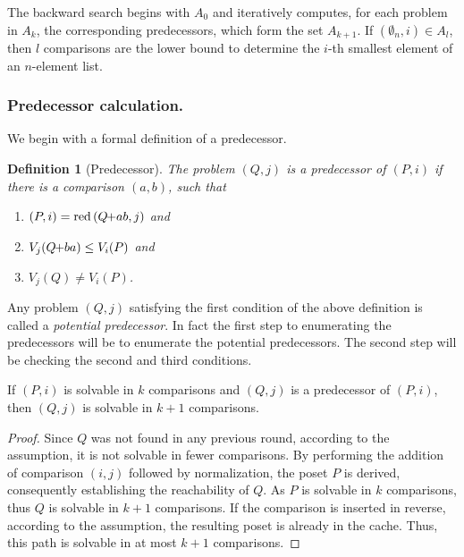 \documentclass[twoside,leqno,twocolumn]{article}
\newcommand{\pchild}[3]{{#1}\kern-1pt{+}{#2}{#3}}
\newcommand{\reduced}[1]{\operatorname{red}{#1}}
\newtheorem{definition}{Definition}[section]
\begin{document}
The backward search begins with $A_0$ and iteratively computes, for each problem in $A_k$, the corresponding predecessors, which form the set $A_{k + 1}$.
If $(\emptyset_n, i) \in A_l$, then $l$ comparisons are the lower bound to determine the $i$-th smallest element of an $n$-element list.


\subsubsection{Predecessor calculation.} \label{sec:backward:predecessor_calculation}
We begin with a formal definition of a predecessor.

\begin{definition}[Predecessor] \label{definition:predecessor_calculation}
  The problem $(Q, j)$ is a \emph{predecessor} of $(P, i)$ if there is a comparison $(a, b)$, such that
  \begin{enumerate}
    \item $(P, i) = \reduced(\pchild{Q}{a}{b}, j)$ and
    \item $V_j(\pchild{Q}{b}{a}) \le V_i(P)$ and
    \item $V_j(Q) \neq V_i(P)$.
  \end{enumerate}
\end{definition}

Any problem $(Q, j)$ satisfying the first condition of the above definition is called a \emph{potential predecessor}.
In fact the first step to enumerating the predecessors will be to enumerate the potential predecessors.
The second step will be checking the second and third conditions.

\begin{lemma} \label{lemma:predecessor_calculation}
  If $(P, i)$ is solvable in $k$ comparisons and $(Q, j)$ is a predecessor of $(P, i)$, then $(Q, j)$ is solvable in $k + 1$ comparisons.
\end{lemma}

\begin{proof} \label{proof:predecessor_calculation}
  Since $Q$ was not found in any previous round, according to the assumption, it is not solvable in fewer comparisons.
  By performing the addition of comparison $(i, j)$ followed by normalization, the poset $P$ is derived, consequently establishing the reachability of $Q$.
  As $P$ is solvable in $k$ comparisons, thus $Q$ is solvable in $k + 1$ comparisons.
  If the comparison is inserted in reverse, according to the assumption, the resulting poset is already in the cache.
  Thus, this path is solvable in at most $k + 1$ comparisons.
\end{proof}
\end{document}
